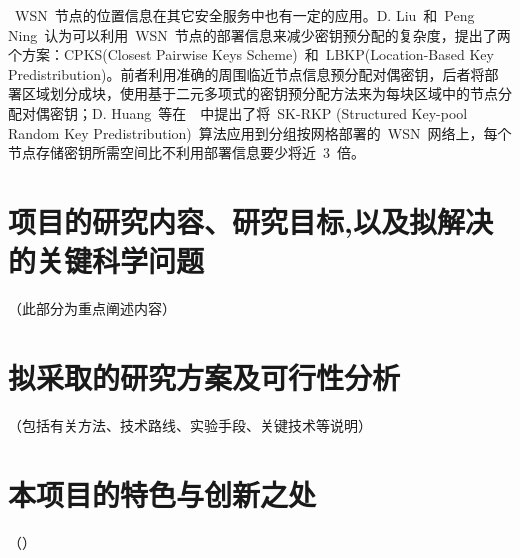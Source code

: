 \documentclass[a4paper,10pt]{article}
\begin{document}
~WSN~节点的位置信息在其它安全服务中也有一定的应用。D. Liu~和~Peng Ning~认为可以利用~WSN~节点的部署信息来减少密钥预分配的复杂度，提出了两个方案：CPKS(Closest Pairwise Keys Scheme)~和~LBKP(Location-Based Key Predistribution)\cite{Liu2003}。前者利用准确的周围临近节点信息预分配对偶密钥，后者将部署区域划分成块，使用基于二元多项式的密钥预分配方法来为每块区域中的节点分配对偶密钥；D. Huang~等在~\cite{Huang2004}~中提出了将~SK-RKP (Structured Key-pool Random Key Predistribution)~算法应用到分组按网格部署的~WSN~网络上，每个节点存储密钥所需空间比不利用部署信息要少将近~3~倍。

\section{项目的研究内容、研究目标,以及拟解决的关键科学问题} 

（此部分为重点阐述内容）

\section{拟采取的研究方案及可行性分析} 

（包括有关方法、技术路线、实验手段、关键技术等说明）

\section{本项目的特色与创新之处} 

（）



\end{document}
